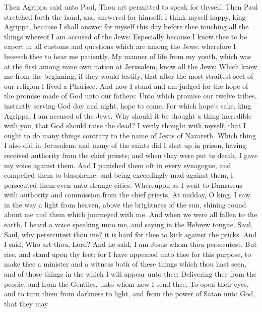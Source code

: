  Then Agrippa said unto Paul, Thou art permitted to speak
for thyself. Then Paul stretched forth the hand, and answered for
himself:  I think myself happy, king Agrippa, because I
shall answer for myself this day before thee touching all the things
whereof I am accused of the Jews:  Especially because I
know thee to be expert in all customs and questions which are among the
Jews: wherefore I beseech thee to hear me patiently.  My
manner of life from my youth, which was at the first among mine own
nation at Jerusalem, know all the Jews;  Which knew me
from the beginning, if they would testify, that after the most straitest
sect of our religion I lived a Pharisee.  And now I stand
and am judged for the hope of the promise made of God unto our fathers:
 Unto which promise our twelve tribes, instantly serving
God day and night, hope to come. For which hope's sake, king Agrippa, I
am accused of the Jews.  Why should it be thought a thing
incredible with you, that God should raise the dead?  I
verily thought with myself, that I ought to do many things contrary to
the name of Jesus of Nazareth.  Which thing I also did in
Jerusalem: and many of the saints did I shut up in prison, having
received authority from the chief priests; and when they were put to
death, I gave my voice against them.  And I punished them
oft in every synagogue, and compelled them to blaspheme; and being
exceedingly mad against them, I persecuted them even unto strange
cities.  Whereupon as I went to Damascus with authority
and commission from the chief priests,  At midday, O
king, I saw in the way a light from heaven, above the brightness of the
sun, shining round about me and them which journeyed with me.
 And when we were all fallen to the earth, I heard a
voice speaking unto me, and saying in the Hebrew tongue, Saul, Saul, why
persecutest thou me? it is hard for thee to kick against the pricks.
 And I said, Who art thou, Lord? And he said, I am Jesus
whom thou persecutest.  But rise, and stand upon thy
feet: for I have appeared unto thee for this purpose, to make thee a
minister and a witness both of these things which thou hast seen, and of
those things in the which I will appear unto thee; 
Delivering thee from the people, and from the Gentiles, unto whom now I
send thee,  To open their eyes, and to turn them from
darkness to light, and from the power of Satan unto God, that they may
